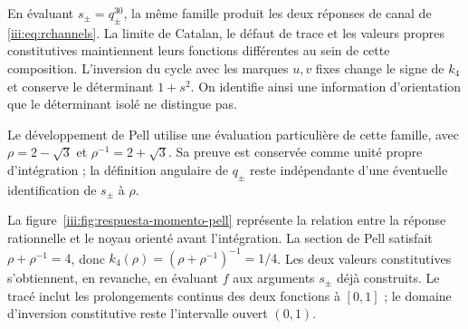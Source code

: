 En évaluant $s_\pm=q_\pm^{30}$, la même famille produit les deux réponses
de canal de \eqref{iii:eq:rchannels}. La limite de Catalan, le défaut de
trace et les valeurs propres constitutives maintiennent leurs fonctions différentes
au sein de cette composition. L’inversion du cycle avec les marques $u,v$
fixes change le signe de $k_4$ et conserve le déterminant $1+s^2$.
On identifie ainsi une information d’orientation que le déterminant
isolé ne distingue pas.

Le développement de Pell utilise une évaluation particulière de cette famille,
avec $\rho=2-\sqrt3$ et $\rho^{-1}=2+\sqrt3$. Sa preuve est conservée comme
unité propre d’intégration ; la définition angulaire de $q_\pm$ reste
indépendante d’une éventuelle identification de $s_\pm$ à $\rho$.

La figure~\ref{iii:fig:respuesta-momento-pell} représente la relation entre
la réponse rationnelle et le noyau orienté avant l’intégration. La section
de Pell satisfait $\rho+\rho^{-1}=4$, donc
$k_4(\rho)=(\rho+\rho^{-1})^{-1}=1/4$. Les deux valeurs constitutives
s’obtiennent, en revanche, en évaluant $f$ aux arguments $s_\pm$ déjà
construits. Le tracé inclut les prolongements continus des deux
fonctions à $[0,1]$ ; le domaine d’inversion constitutive reste
l’intervalle ouvert $(0,1)$.

